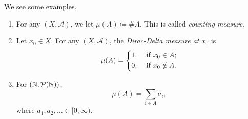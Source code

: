 \begin{eg}
	We see some examples.
	\begin{enumerate}
		\item\label{eg:counting-measure} For any \((X, \mathcal{A})\), we let \(\mu(A) \coloneqq \# A\). This is called \emph{counting measure}.
		\item\label{eg:Dirac-Delta measure} Let \(x_0\in X\). For any \((X, \mathcal{A})\), the \emph{Dirac-Delta \hyperref[def:measure]{measure} at \(x_0\)} is
		\[
			\mu(A) = \begin{dcases}
				1, & \text{ if } x_0\in A;    \\
				0, & \text{ if } x_0\notin A.
			\end{dcases}
		\]
		\item For \((\mathbb{\MakeUppercase{N}}, \mathcal{P} (\mathbb{\MakeUppercase{N}} ))\),
		      \[
			      \mu(A) = \sum\limits_{i\in A}a_{i},
		      \]
		      where \(a_1, a_2, \ldots \in [0, \infty) \).
	\end{enumerate}
\end{eg}



